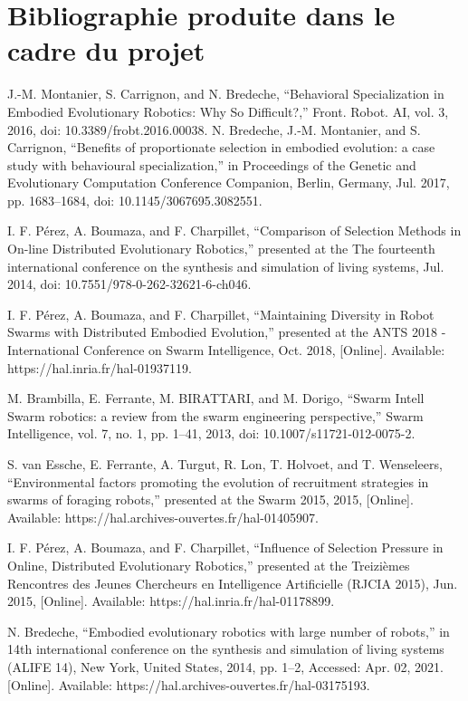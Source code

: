 \documentclass[11pt]{article}
\begin{document}
\section{Bibliographie produite dans le cadre du projet}

\flushleft
\justify
[1]J.-M. Montanier, S. Carrignon, and N. Bredeche, “Behavioral Specialization in Embodied Evolutionary Robotics: Why So Difficult?,” Front. Robot. AI, vol. 3, 2016, doi: 10.3389/frobt.2016.00038. 
\flushleft
\justify
[2]N. Bredeche, J.-M. Montanier, and S. Carrignon, “Benefits of proportionate selection in embodied evolution: a case study with behavioural specialization,” in Proceedings of the Genetic and Evolutionary Computation Conference Companion, Berlin, Germany, Jul. 2017, pp. 1683–1684, doi: 10.1145/3067695.3082551. 

\flushleft
\justify
[3]I. F. Pérez, A. Boumaza, and F. Charpillet, “Comparison of Selection Methods in On-line Distributed Evolutionary Robotics,” presented at the The fourteenth international conference on the synthesis and simulation of living systems, Jul. 2014, doi: 10.7551/978-0-262-32621-6-ch046.

\flushleft
\justify
[4]I. F. Pérez, A. Boumaza, and F. Charpillet, “Maintaining Diversity in Robot Swarms with Distributed Embodied Evolution,” presented at the ANTS 2018 - International Conference on Swarm Intelligence, Oct. 2018, [Online]. Available: https://hal.inria.fr/hal-01937119.

\flushleft
\justify
[5]M. Brambilla, E. Ferrante, M. BIRATTARI, and M. Dorigo, “Swarm Intell Swarm robotics: a review from the swarm engineering perspective,” Swarm Intelligence, vol. 7, no. 1, pp. 1–41, 2013, doi: 10.1007/s11721-012-0075-2.

\flushleft
\justify
[6]S. van Essche, E. Ferrante, A. Turgut, R. Lon, T. Holvoet, and T. Wenseleers, “Environmental factors promoting the evolution of recruitment strategies in swarms of foraging robots,” presented at the Swarm 2015, 2015, [Online]. Available: https://hal.archives-ouvertes.fr/hal-01405907.

\flushleft
\justify
[7]I. F. Pérez, A. Boumaza, and F. Charpillet, “Influence of Selection Pressure in Online, Distributed Evolutionary Robotics,” presented at the Treizièmes Rencontres des Jeunes Chercheurs en Intelligence Artificielle (RJCIA 2015), Jun. 2015, [Online]. Available: https://hal.inria.fr/hal-01178899.

\flushleft
\justify
[8]N. Bredeche, “Embodied evolutionary robotics with large number of robots,” in 14th international conference on the synthesis and simulation of living systems (ALIFE 14), New York, United States, 2014, pp. 1–2, Accessed: Apr. 02, 2021. [Online]. Available: https://hal.archives-ouvertes.fr/hal-03175193.
\end{document}
